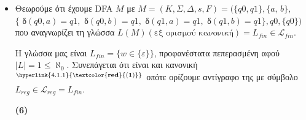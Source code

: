 \begin{tcolorbox}[colback=yellow!15!white, colframe=blue!50!white,
	fonttitle=\bfseries\Large, title = Απόδειξη - μέρος 1/3]
\begin{itemize}
\begin{comment}
		\item Για $A = C \overset{\text{(6)}}{\rightarrow} (A \cup B) - A = (A-A) \cup (B-A) = \emptyset \cup (B-A)
		= B-A$
		\begin{flushright}(7)\end{flushright}
		\end{comment}

	\end{itemize}
\end{tcolorbox}

\begin{tcolorbox}[colback=yellow!15!white, colframe=blue!50!white,
	fonttitle=\bfseries\Large, title = Απόδειξη - μέρος 2/3]
	\begin{itemize}
		\itemsep1em

		\item \quad Θεωρούμε ότι έχουμε DFA $M$ με
		$M = (K, \Sigma, \Delta, s, F)=(\{q0, q1\}, \{a,\,b\},$\\
		$\{$ δ$(q0, a)\!=\! q1,$ δ$(q0, b)\!=\! q1,$ δ$(q1, a)\!=\! q1,$ δ$(q1, b)\!=\!
		q1 \}, q0,\{q0\})$\\
		που αναγνωρίζει τη γλώσσα $L(M) (\text{εξ ορισμού κανονική})= L_{fin} \in \mathcal{L}_{fin}$.\\
		\reducevspace\reducevspace\reducevspace\reducevspace\reducevspace\reducevspace
		\reducevspace\reducevspace\reducevspace\reducevspace\reducevspace\reducevspace
		\reducevspace\reducevspace\reducevspace\reducevspace\reducevspace\reducevspace
		\reducevspace\reducevspace\reducevspace\reducevspace\reducevspace\reducevspace
		\par \quad Η γλώσσα μας είναι $L_{fin} = \{ w \in \{\mathcal{ε}\}\}$, προφανέστατα πεπερασμένη
		αφού $\vert L\vert = 1 \leq \aleph_0$. Συνεπάγεται ότι
		είναι και κανονική$^{\hyperlink{4.1.1}{\bf{\textcolor{red}{(1)}}}}$ οπότε ορίζουμε αντίγραφο της με σύμβολο
		$L_{reg} \in \mathcal{L}_{reg} =
		L_{fin}$.
		\reducevspace\reducevspace\reducevspace\reducevspace\reducevspace\reducevspace\reducevspace
		\reducevspace\reducevspace\reducevspace\reducevspace\reducevspace\reducevspace\reducevspace
		\reducevspace\reducevspace\reducevspace\reducevspace\reducevspace\reducevspace\reducevspace
		\begin{flushright}\hypertarget{4.1.6}{\bf{(6)}}\end{flushright}


\end{itemize}
\end{tcolorbox}
